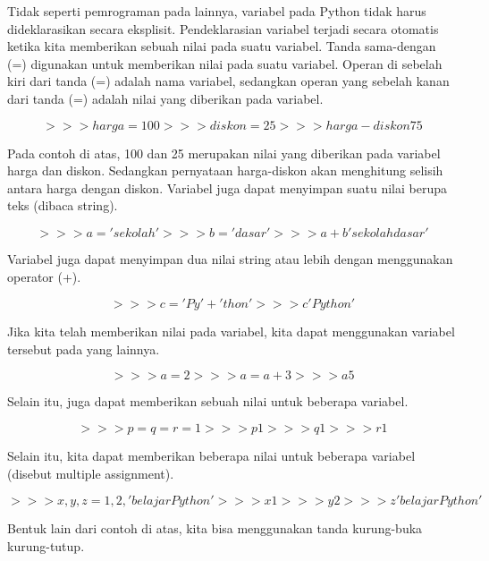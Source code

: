 Tidak seperti pemrograman pada lainnya, variabel pada Python tidak harus dideklarasikan secara eksplisit. Pendeklarasian variabel terjadi secara otomatis ketika kita memberikan sebuah nilai pada suatu variabel. Tanda sama-dengan (=) digunakan untuk memberikan nilai pada suatu variabel. Operan di sebelah kiri dari tanda (=) adalah nama variabel, sedangkan operan yang sebelah kanan dari tanda (=) adalah nilai yang diberikan pada variabel.\cite{utamipemrograman}

\begin{equation}
>>>harga = 100
>>>diskon = 25
>>>harga - diskon
75
\end{equation}

Pada contoh di atas, 100 dan 25 merupakan nilai yang diberikan pada variabel harga dan diskon. Sedangkan pernyataan harga-diskon akan menghitung selisih antara harga dengan diskon. Variabel juga dapat menyimpan suatu nilai berupa teks (dibaca string).

\begin{equation}
>>>a = 'sekolah'
>>>b = 'dasar'
>>>a + b
'sekolahdasar'
\end{equation}

Variabel juga dapat menyimpan dua nilai string atau lebih dengan menggunakan operator (+).

\begin{equation}
>>>c = 'Py' + 'thon'
>>>c
'Python'
\end{equation}

Jika kita telah memberikan nilai pada variabel, kita dapat menggunakan variabel tersebut pada yang lainnya.

\begin{equation}
>>>a = 2
>>>a = a + 3
>>>a
5
\end{equation}

Selain itu, juga dapat memberikan sebuah nilai untuk beberapa variabel.

\begin{equation}
>>>p=q=r=1
>>>p
1
>>>q
1
>>>r
1
\end{equation}

Selain itu, kita dapat memberikan beberapa nilai untuk beberapa variabel (disebut multiple assignment).

\begin{equation}
>>>x, y, z = 1, 2, 'belajar Python'
>>>x
1
>>>y
2
>>>z
'belajar Python'
\end{equation}

Bentuk lain dari contoh di atas, kita bisa menggunakan tanda kurung-buka kurung-tutup.

